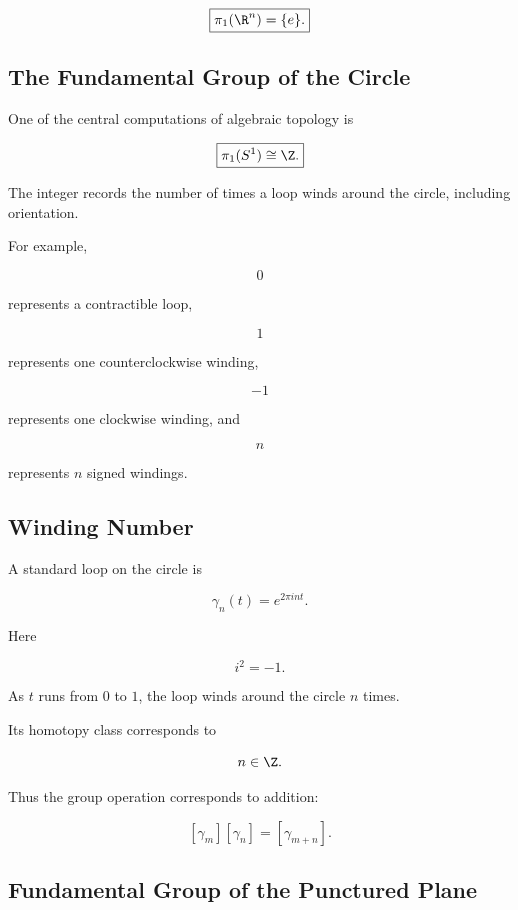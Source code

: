 \[
\boxed{
\pi_1(\R^n)
=
\{e\}.
}
\]

\subsection{The Fundamental Group of the Circle}
\label{subsec:fundamental-group-circle}

One of the central computations of algebraic topology is

\[
\boxed{
\pi_1(S^1)
\cong
\Z.
}
\]

The integer records the number of times a loop winds around the circle,
including orientation.

For example,

\[
0
\]

represents a contractible loop,

\[
1
\]

represents one counterclockwise winding,

\[
-1
\]

represents one clockwise winding, and

\[
n
\]

represents \(n\) signed windings.

\subsection{Winding Number}
\label{subsec:topological-winding-number}

A standard loop on the circle is

\[
\boxed{
\gamma_n(t)
=
e^{2\pi i n t}.
}
\]

Here

\[
i^2=-1.
\]

As \(t\) runs from \(0\) to \(1\), the loop winds around the circle \(n\)
times.

Its homotopy class corresponds to

\[
n\in\Z.
\]

Thus the group operation corresponds to addition:

\[
\boxed{
[\gamma_m][\gamma_n]
=
[\gamma_{m+n}].
}
\]

\subsection{Fundamental Group of the Punctured Plane}
\label{subsec:fundamental-group-punctured-plane}

